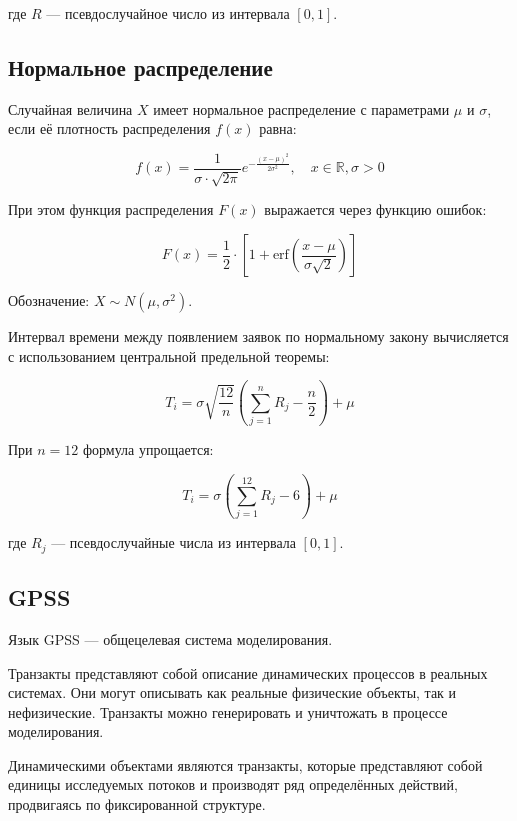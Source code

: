 где $R$ — псевдослучайное число из интервала $[0, 1]$.

\subsection{Нормальное распределение}

Случайная величина $X$ имеет нормальное распределение с параметрами $\mu$ и $\sigma$, если её плотность распределения $f(x)$ равна:

\begin{equation}
f(x) = \frac{1}{\sigma \cdot \sqrt{2\pi}} e^{-\frac{(x-\mu)^2}{2\sigma^2}}, \quad x \in \mathbb{R}, \sigma > 0
\end{equation}

При этом функция распределения $F(x)$ выражается через функцию ошибок:

\begin{equation}
F(x) = \frac{1}{2} \cdot \left[ 1 + \text{erf}\left(\frac{x-\mu}{\sigma\sqrt{2}}\right) \right]
\end{equation}

Обозначение: $X \sim N(\mu, \sigma^2)$.

Интервал времени между появлением заявок по нормальному закону вычисляется с использованием центральной предельной теоремы:

\begin{equation}
T_i = \sigma \sqrt{\frac{12}{n}} \left( \sum_{j=1}^{n} R_j - \frac{n}{2} \right) + \mu
\end{equation}

При $n = 12$ формула упрощается:

\begin{equation}
T_i = \sigma \left( \sum_{j=1}^{12} R_j - 6 \right) + \mu
\end{equation}

где $R_j$ — псевдослучайные числа из интервала $[0, 1]$.

\subsection{GPSS}

Язык GPSS — общецелевая система моделирования.

Транзакты представляют собой описание динамических процессов в реальных системах. Они могут описывать как реальные физические объекты, так и нефизические. Транзакты можно генерировать и уничтожать в процессе моделирования.

Динамическими объектами являются транзакты, которые представляют собой единицы исследуемых потоков и производят ряд определённых действий, продвигаясь по фиксированной структуре.

